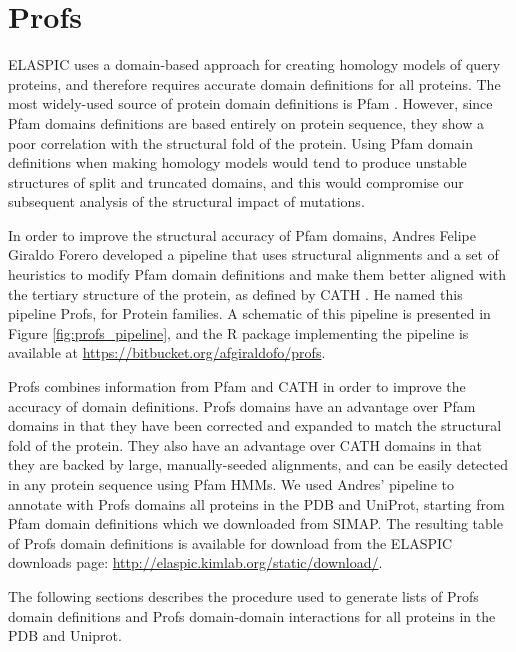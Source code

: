 
 \label{chap:implementation}


\section{Profs}

ELASPIC uses a domain-based approach for creating homology models of query proteins, and therefore requires accurate domain definitions for all proteins. The most widely-used source of protein domain definitions is Pfam \cite{punta_pfam_2012}. However, since Pfam domains definitions are based entirely on protein sequence, they show a poor correlation with the structural fold of the protein. Using Pfam domain definitions when making homology models would tend to produce unstable structures of split and truncated domains, and this would compromise our subsequent analysis of the structural impact of mutations.

In order to improve the structural accuracy of Pfam domains, Andres Felipe Giraldo Forero developed a pipeline that uses structural alignments and a set of heuristics to modify Pfam domain definitions and make them better aligned with the tertiary structure of the protein, as defined by CATH \cite{cuff_extending_2011}. He named this pipeline Profs, for Protein families. A schematic of this pipeline is presented in Figure \ref{fig:profs_pipeline}, and the R package implementing the pipeline is available at \url{https://bitbucket.org/afgiraldofo/profs}.

Profs combines information from Pfam and CATH in order to improve the accuracy of domain definitions. Profs domains have an advantage over Pfam domains in that they have been corrected and expanded to match the structural fold of the protein. They also have an advantage over CATH domains in that they are backed by large, manually-seeded alignments, and can be easily detected in any protein sequence using Pfam HMMs. We used Andres' pipeline to annotate with Profs domains all proteins in the PDB and UniProt, starting from Pfam domain definitions which we downloaded from SIMAP. The resulting table of Profs domain definitions is available for download from the ELASPIC downloads page: \url{http://elaspic.kimlab.org/static/download/}.

The following sections describes the procedure used to generate lists of Profs domain definitions and Profs domain-domain interactions for all proteins in the PDB and Uniprot.

